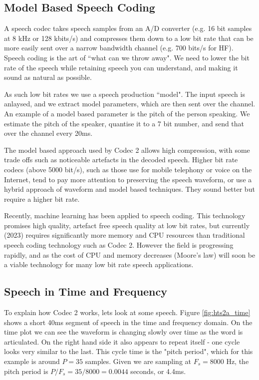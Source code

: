 \documentclass{article}
\begin{document}
\subsection{Model Based Speech Coding}

A speech codec takes speech samples from an A/D converter (e.g. 16 bit samples at 8 kHz or 128 kbits/s) and compresses them down to a low bit rate that can be more easily sent over a narrow bandwidth channel (e.g. 700 bits/s for HF).  Speech coding is the art of ``what can we throw away". We need to lower the bit rate of the speech while retaining speech you can understand, and making it sound as natural as possible.

As such low bit rates we use a speech production ``model".  The input speech is anlaysed, and we extract model parameters, which are then sent over the channel.  An example of a model based parameter is the pitch of the person speaking.  We estimate the pitch of the speaker, quantise it to a 7 bit number, and send that over the channel every 20ms.

The model based approach used by Codec 2 allows high compression, with some trade offs such as noticeable artefacts in the decoded speech.  Higher bit rate codecs (above 5000 bit/s), such as those use for mobile telephony or voice on the Internet, tend to pay more attention to preserving the speech waveform, or use a hybrid approach of waveform and model based techniques.  They sound better but require a higher bit rate.

Recently, machine learning has been applied to speech coding.  This technology promises high quality, artefact free speech quality at low bit rates, but currently (2023) requires significantly more memory and CPU resources than traditional speech coding technology such as Codec 2.  However the field is progressing rapidly, and as the cost of CPU and memory decreases (Moore's law) will soon be a viable technology for many low bit rate speech applications.

\subsection{Speech in Time and Frequency}

To explain how Codec 2 works, lets look at some speech. Figure \ref{fig:hts2a_time} shows a short 40ms segment of speech in the time and frequency domain.  On the time plot we can see the waveform is changing slowly over time as the word is articulated.  On the right hand side it also appears to repeat itself - one cycle looks very similar to the last.  This cycle time is the "pitch period", which for this example is around $P=35$ samples.  Given we are sampling at $F_s=8000$ Hz, the pitch period is $P/F_s=35/8000=0.0044$ seconds, or 4.4ms.
\end{document}
